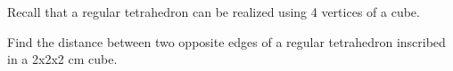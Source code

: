 Recall that a regular tetrahedron can be realized using 4 vertices of a cube. 

Find the distance between two opposite edges of a regular tetrahedron inscribed in a 2x2x2 cm cube.


\answer{$2cm$}